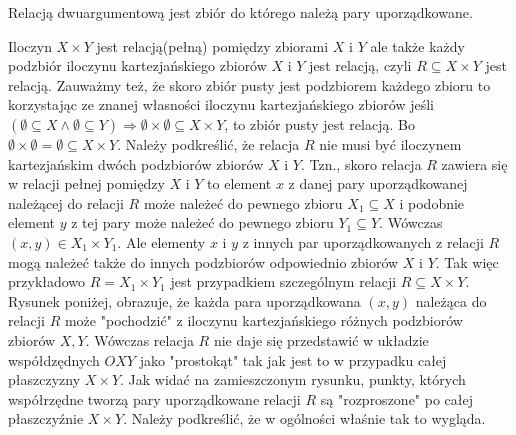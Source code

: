 \begin{definition}
Relacją dwuargumentową jest zbiór do którego należą pary uporządkowane.
\end{definition}
\begin{remark}
Iloczyn $X\times Y$ jest relacją(pełną) pomiędzy zbiorami $X$ i $Y$ ale także każdy podzbiór iloczynu kartezjańskiego zbiorów $X$ i $Y$ jest relacją, czyli $R\subseteq X\times Y$ jest relacją. 
Zauważmy też, że skoro zbiór pusty jest podzbiorem każdego zbioru to korzystając ze znanej własności iloczynu kartezjańskiego zbiorów jeśli $(\emptyset\subseteq X\wedge\emptyset\subseteq Y)\Rightarrow\emptyset\times\emptyset\subseteq X\times Y$, to zbiór pusty jest relacją. Bo $\emptyset\times\emptyset=\emptyset\subseteq X\times Y$.
Należy podkreślić, że relacja $R$ nie musi być iloczynem kartezjańskim dwóch podzbiorów zbiorów $X$ i $Y$. Tzn., skoro relacja $R$ zawiera się w relacji pełnej pomiędzy $X$ i $Y$ to element $x$ z danej pary uporządkowanej należącej do relacji $R$ może należeć do pewnego zbioru $X_{1}\subseteq X$ i podobnie element $y$ z tej pary może należeć do pewnego zbioru $Y_{1}\subseteq Y$. Wówczas $(x,y)\in X_{1}\times Y_{1}$. Ale elementy $x$ i $y$ z innych par uporządkowanych z relacji $R$ mogą należeć także do innych podzbiorów odpowiednio zbiorów $X$ i $Y$. Tak więc przykładowo $R=X_{1}\times Y_{1}$ jest przypadkiem szczególnym relacji $R\subseteq X\times Y$.
Rysunek poniżej, obrazuje, że każda para uporządkowana $(x,y)$ należąca do relacji $R$ może "pochodzić" z iloczynu kartezjańskiego różnych podzbiorów zbiorów $X,Y$. Wówczas relacja $R$ nie daje się przedstawić w układzie współdzędnych $OXY$
jako "prostokąt" tak jak jest to w przypadku całej płaszczyzny $X\times Y$. Jak widać na zamieszczonym rysunku, punkty, których współrzędne tworzą pary uporządkowane relacji $R$ są "rozproszone" po całej płaszczyźnie $X\times Y$.
Należy podkreślić, że w ogólności właśnie tak to wygląda.
\end{remark}
\begin{center}
\end{center}
